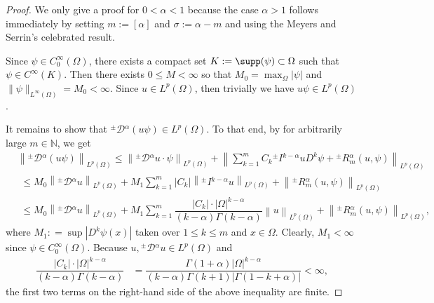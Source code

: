 \documentclass[leqno,final]{siamltex}
\numberwithin{equation}{section}
\renewcommand{\(}{\bigl(}
\renewcommand{\)}{\bigr)}
\newcommand{\N}{\mathbb{N}}
\begin{document}
    \begin{proof}
    	We only give a proof for $0<\alpha<1$ because the case $\alpha>1$ follows immediately by setting
    	$m:=[\alpha]$ and $\sigma:=\alpha-m$ and using the Meyers and Serrin's celebrated result.
    	
        Since $\psi \in C^{\infty}_{0}(\Omega)$, there exists a compact set $K:=\supp(\psi) \subset \Omega$ such that  $\psi \in C^{\infty}(K)$. Then there exists $0 \leq M <\infty$ so that $M_0 = \max_{\Omega}|\psi|$ and 
        $\|\psi\|_{L^{\infty}(\Omega)} = M_{0} < \infty.$      
        Since $u \in L^{p}(\Omega)$, then trivially we have $u\psi \in L^{p}(\Omega)$.

        It remains to show that ${^{\pm}}{\mathcal{D}}{^{\alpha}} (u\psi) \in L^{p}(\Omega)$. 
        To that end, by \cite[Theorem 4.3]{Feng_Sutton} for arbitrarily large $m \in\N$, we get
        \begin{align*}
            &\left\|{^{\pm}}{\mathcal{D}}{^{\alpha}} (u \psi) \right\|_{L^{p}(\Omega)} \leq \left\|{^{\pm}}{\mathcal{D}}{^{\alpha}} u \cdot \psi \right\|_{L^{p}(\Omega)} 
            + \left\|\sum_{k=1}^{m} C_{k} {^{\pm}}{I}{^{k-\alpha}} u D^{k} \psi  + {^{\pm}}{R}{^{\alpha}_{m}}(u,\psi) \right\|_{L^{p}(\Omega)} \\
            &\,\, \leq M_0 \left\| {^{\pm}}{\mathcal{D}}{^{\alpha}} u \right\|_{L^{p}(\Omega)} + M_1 \sum_{k=1}^{m}\left| C_{k}\right| \left\|{^{\pm}}{I}{^{k - \alpha}} u\right\|_{L^{p}(\Omega)}  + \left\| {^{\pm}}{R}{^{\alpha}_{m}} (u,\psi) \right\|_{L^{p}(\Omega)}\\
            &\,\, \leq M_0 \left\| {^{\pm}}{\mathcal{D}}{^{\alpha}} u \right\|_{L^{p}(\Omega)} + M_1 \sum_{k=1}^{m} \dfrac{\left| C_{k}\right| \cdot |\Omega|^{k-\alpha} }{ ( k- \alpha) \Gamma(k - \alpha)} \left\|u\right\|_{L^{p}(\Omega)}  + \left\| {^{\pm}}{R}{^{\alpha}_{m} }(u,\psi) \right\|_{L^{p}(\Omega)},
        \end{align*}
        where $M_1 : = \sup \left| D^{k} \psi(x) \right|$ taken over $1 \leq k \leq m$ and $x \in \Omega$. Clearly, $M_1 < \infty$ since $\psi \in C^{\infty}_{0} (\Omega)$. Because  $u, {^{\pm}}{\mathcal{D}}{^{\alpha}} u\in L^{p}(\Omega)$  and 
        \begin{align*}
            \dfrac{\left| C_{k}\right| \cdot |\Omega|^{k-\alpha} }{ ( k- \alpha) \Gamma(k - \alpha)} &= \dfrac{\Gamma(1 + \alpha) |\Omega|^{k-\alpha}  }{(k - \alpha) \Gamma(k+1) |\Gamma( 1- k + \alpha)|} <\infty,
        \end{align*}
        the first two terms on the right-hand side of the above inequality are finite. 


\end{proof}
\end{document}
